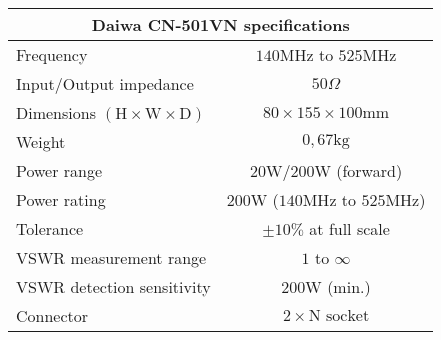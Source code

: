 \footnotesize
\begin{tabular}{|l|c|}
	\hline
	\multicolumn{2}{|c|}{\textbf{Daiwa CN-501VN specifications}} \\
	\hline
 	Frequency & $140\mathrm{MHz}$ to $525\mathrm{MHz}$ \\
	Input/Output impedance & $50\Omega$\\
	Dimensions $\mathrm{(H \times W \times D)}$ & $80 \times 155 \times 100 \mathrm{mm}$ \\%
 	Weight& $0,67\mathrm{kg}$ \\%
	Power range & $20\mathrm{W}/200\mathrm{W}$ (forward) \\
	Power rating & $200\mathrm{W}$ ($140\mathrm{MHz}$ to $525\mathrm{MHz}$) \\
	Tolerance & $\pm10\%$ at full scale \\
	VSWR measurement range & $1$ to $\infty$\\
	VSWR detection sensitivity & $200\mathrm{W}$ (min.)\\
	Connector & $2 \times \text{N socket}$ \\
	\hline
\end{tabular}
